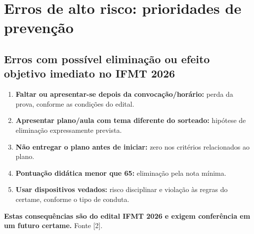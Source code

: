 \documentclass[11pt,a4paper]{article}
\begin{document}
\section{Erros de alto risco: prioridades de prevenção}
\subsection{Erros com possível eliminação ou efeito objetivo imediato no IFMT 2026}
\begin{alerta}
\begin{enumerate}
\item \textbf{Faltar ou apresentar-se depois da convocação/horário:} perda da prova, conforme as condições do edital.
\item \textbf{Apresentar plano/aula com tema diferente do sorteado:} hipótese de eliminação expressamente prevista.
\item \textbf{Não entregar o plano antes de iniciar:} zero nos critérios relacionados ao plano.
\item \textbf{Pontuação didática menor que 65:} eliminação pela nota mínima.
\item \textbf{Usar dispositivos vedados:} risco disciplinar e violação às regras do certame, conforme o tipo de conduta.
\end{enumerate}
\textbf{Estas consequências são do edital IFMT 2026 e exigem conferência em um futuro certame.} Fonte [2].
\end{alerta}
\end{document}

